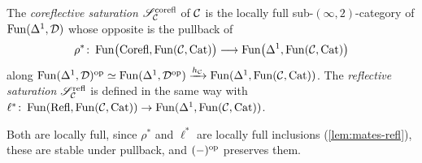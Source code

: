 \begin{defi}
\label{def:saturation-C}
%
The \emph{coreflective saturation}
$\mathscr{S}^{\mathrm{corefl}}_{\mathcal{C}}$
of $\mathcal{C}$ is the locally full sub-$(\infty,2)$-category of $\operatorname{Fun}(\Delta^{1},\mathcal{D})$
whose opposite is the pullback of
\begin{equation*}
\rho^{*}\colon \operatorname{Fun}\bigl(\mathrm{Corefl},\operatorname{Fun}(\mathcal{C},\mathrm{Cat})\bigr) \longrightarrow
\operatorname{Fun}\bigl(\Delta^{1},\operatorname{Fun}(\mathcal{C},\mathrm{Cat})\bigr)
\end{equation*}
along
$\operatorname{Fun}(\Delta^{1},\mathcal{D})^{\mathrm{op}} \simeq \operatorname{Fun}(\Delta^{1},\mathcal{D}^{\mathrm{op}})
\xrightarrow{h_{\mathcal{C}}} \operatorname{Fun}(\Delta^{1},\operatorname{Fun}(\mathcal{C},\mathrm{Cat}))$.
The \emph{reflective saturation}
$\mathscr{S}^{\mathrm{refl}}_{\mathcal{C}}$
is defined in the same way with
$\ell^{*}\colon \operatorname{Fun}(\mathrm{Refl},\operatorname{Fun}(\mathcal{C},\mathrm{Cat})) \to
\operatorname{Fun}(\Delta^{1},\operatorname{Fun}(\mathcal{C},\mathrm{Cat}))$.
\end{defi}

%
Both are locally full, since $\rho^{*}$ and $\ell^{*}$ are locally full
inclusions (\cref{lem:mates-refl}), these are stable under pullback,
and $(-)^{\mathrm{op}}$ preserves them.

